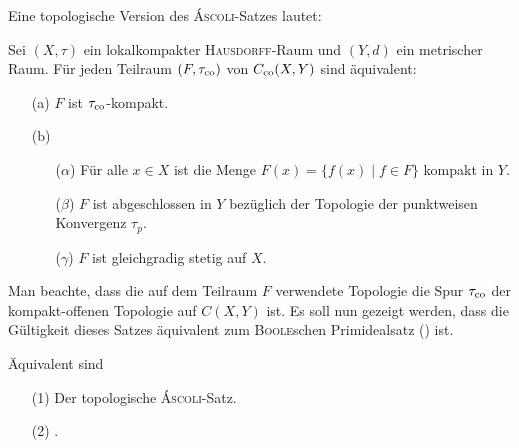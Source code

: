Eine topologische Version des \textsc{Áscoli}-Satzes lautet:
\begin{defn}
  Sei $(X,\tau)$ ein lokalkompakter \textsc{Hausdorff}-Raum und $(Y,d)$ ein metrischer Raum.
  Für jeden Teilraum $(F,\tau_{\mathrm{co}})$ von $C_{\mathrm{co}}(X,Y)$ sind äquivalent:
  \begin{enumerate}
    \item[(a)] $F$ ist $\tau_{\mathrm{co}}$-kompakt.
    \item[(b)] \begin{enumerate}
        \item[($\alpha$)] Für alle $x \in X$ ist die Menge $F(x) = \{f(x) \mid f \in F \}$ kompakt in $Y$.
        \item[($\beta$)]  $F$ ist abgeschlossen in $Y$ bezüglich der Topologie der punktweisen Konvergenz $\tau_p$.
        \item[($\gamma$)] $F$ ist gleichgradig stetig auf $X$.
      \end{enumerate}
  \end{enumerate}
\end{defn}

Man beachte, dass die auf dem Teilraum $F$ verwendete Topologie die Spur $\tau_{\mathrm{co}}$ der kompakt-offenen Topologie auf $C(X,Y)$ ist.
Es soll nun gezeigt werden, dass die Gültigkeit dieses Satzes äquivalent zum \textsc{Boole}schen Primidealsatz (\PIT) ist.

\begin{thm}
  \label{thm:ascoliPIT}
  Äquivalent sind
  \begin{enumerate}
    \item[(1)] Der topologische \textsc{Áscoli}-Satz.
    \item[(2)] \PIT.
  \end{enumerate}
\end{thm}

